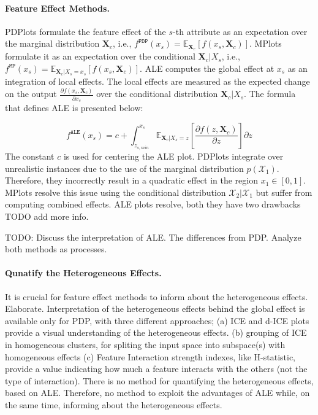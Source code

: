 \documentclass[twoside]{article}
\newcommand{\Xcb}{\mathbf{X}_c}
\begin{document}
\paragraph{Feature Effect Methods.} PDPlots formulate the feature
effect of the \(s\)-th attribute as an expectation over the marginal
distribution \(\mathbf{X}_c\), i.e.,
\(f^{\mathtt{PDP}}(x_s) =
\mathbb{E}_{\mathbf{X}_c}[f(x_s,\mathbf{X}_c)]\). MPlots formulate it
as an expectation over the conditional \(\mathbf{X}_c|X_s\), i.e.,
\(f^{\mathtt{MP}}(x_s) = \mathbb{E}_{\mathbf{X}_c|X_s = x_s}[f(x_s,
\mathbf{X}_c)]\). ALE computes the global effect at \(x_s\) as an
integration of local effects. The local effects are measured as the
expected change on the output
\( \frac{\partial f(x_s, \mathbf{X}_c)}{\partial x_s} \) over the
conditional distribution \( \Xcb|X_s\). The formula that
defines ALE is presented below:

\begin{equation}
  \label{eq:ALE_accumulated_mean}
  f^{\mathtt{ALE}}(x_s) = c + \int_{z_{s,min}}^{x_s} \mathbb{E}_{\Xcb|X_s=z}\left[\frac{\partial f(z, \Xcb)}{\partial z}\right] \partial z
\end{equation}
%
The constant \(c\) is used for centering the ALE plot. PDPlots
integrate over unrealistic instances due to the use of the marginal
distribution \( p(\mathcal{X}_1) \). Therefore, they incorrectly
result in a quadratic effect in the region \(x_1 \in [0, 1]\). MPlots
resolve this issue using the conditional distribution
\( \mathcal{X}_2|\mathcal{X}_1 \) but suffer from computing combined
effects. ALE plots resolve, both they have two drawbacks TODO add more
info.

TODO: Discuss the interpretation of ALE. The differences from PDP. Analyze both methods as processes.

\paragraph{Qunatify the Heterogeneous Effects.} It is crucial for
feature effect methods to inform about the heterogeneous
effects. Elaborate. Interpretation of the heterogeneous effects behind
the global effect is available only for PDP, with three different
approaches; (a) ICE and d-ICE plots provide a visual understanding of
the heterogeneous effects. (b) grouping of ICE in homogeneous
clusters, for spliting the input space into subspace(s) with
homogeneous effects (c) Feature Interaction strength indexes, like
H-statistic, provide a value indicating how much a feature interacts
with the others (not the type of interaction). There is no method for
quantifying the heterogeneous effects, based on ALE. Therefore, no
method to exploit the advantages of ALE while, on the same time,
informing about the heterogeneous effects.
\end{document}

